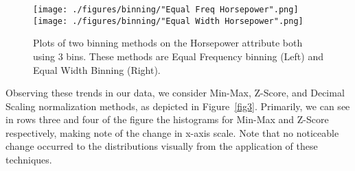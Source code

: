 \documentclass[10pt, conference, compsocconf]{IEEEtran}
\begin{document}
\begin{figure*}[!ht]
	\vspace{-6mm}
	\centering
	\texttt{[image: ./figures/binning/"Equal Freq Horsepower".png]}
	\texttt{[image: ./figures/binning/"Equal Width Horsepower".png]}
	
	\caption{Plots of two binning methods on the Horsepower attribute both using 3 bins. These methods are Equal Frequency binning (Left) and Equal Width Binning (Right).}
	\label{fig4}
\end{figure*}

Observing these trends in our data, we consider Min-Max, Z-Score, and Decimal Scaling normalization methods, as depicted in Figure~\ref{fig3}. Primarily, we can see in rows three and four of the figure the histograms for Min-Max and Z-Score respectively, making note of the change in x-axis scale. Note that no noticeable change occurred to the distributions visually from the application of these techniques.
\end{document}
